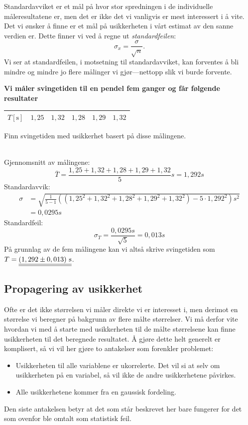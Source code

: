 Standardavviket er et mål på hvor stor spredningen i de individuelle måleresultatene er, men det er ikke det vi vanligvis er mest interessert i å vite. Det vi ønsker å finne er et mål på usikkerheten i vårt estimat av den sanne verdien er. Dette finner vi ved å regne ut \emph{standardfeilen}:
\begin{equation}
	\sigma_x = \frac{\sigma}{\sqrt{n}}.
\end{equation}
Vi ser at standardfeilen, i motsetning til standardavviket, kan forventes å bli mindre og mindre jo flere målinger vi gjør---nettopp slik vi burde forvente.

\begin{texample}
	{\bf	
	Vi måler svingetiden til en pendel fem ganger og får følgende resultater 
	\begin{center}
	\begin{tabular}{|l|c|c|c|c|c|}
		\hline
		$T \mathrm{[s]}$ & $1,25$ & $1,32$ & $1,28$ & $1,29$ & $1,32$ \\
		\hline
	\end{tabular}
	\end{center}
	Finn svingetiden med usikkerhet basert på disse målingene.
	} \\
	Gjennomsnitt av målingene:
	\begin{displaymath}
		\bar{T} = \frac{1,25 + 1,32 + 1,28 + 1,29 + 1,32 }{5}\unit{s} = 1,292\unit{s}
	\end{displaymath}
	Standardavvik:
	\begin{align*}
		\sigma &= \sqrt{\frac{1}{5-1}\left( (1,25^2 + 1,32^2 + 1,28^2 + 1,29^2 + 1,32^2 ) - 5\cdot1,292^2\right)\unit{s^2}} \\
		&= 0,0295\unit{s}
	\end{align*}
	Standardfeil: 
	\begin{displaymath}
		\sigma_{T} = \frac{0,0295\unit{s}}{\sqrt{5}} = 0,013\unit{s}
	\end{displaymath}
	På grunnlag av de fem målingene kan vi altså skrive svingetiden som $T = \underline{\underline{(1,292\pm0,013)~\mathrm{s}}}$. 
\end{texample}

\subsection{Propagering av usikkerhet}
\label{sec:usikkerhet:propagering}
Ofte er det ikke størrelsen vi måler direkte vi er interesset i, men derimot en størrelse vi beregner på bakgrunn av flere målte størrelser. Vi må derfor vite hvordan vi med å starte med usikkerheten til de målte størrelsene kan finne usikkerheten til det beregnede resultatet. Å gjøre dette helt generelt er komplisert, så vi vil her gjøre to antakelser som forenkler problemet:
\begin{itemize}
\item
Usikkerheten til alle variablene er ukorrelerte. Det vil si at selv om usikkerheten på en variabel, så vil ikke de andre usikkerhetene påvirkes.
\item
Alle usikkerhetene kommer fra en gaussisk fordeling. 
\end{itemize}
Den siste antakelsen betyr at det som står beskrevet her bare fungerer for det som ovenfor ble omtalt som statistisk feil. 

